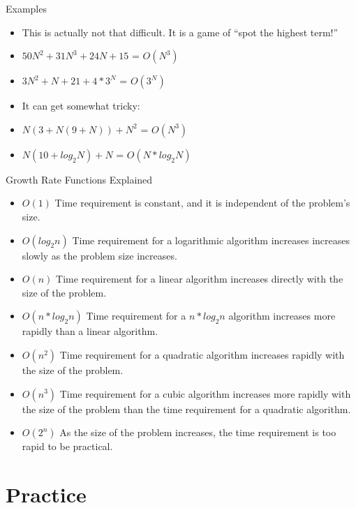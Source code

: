 \documentclass{beamer}
\begin{document}
\begin{frame}{Examples}
\begin{itemize}
\item This is actually not that difficult.  It is a game of ``spot the highest term!''
\item $50N^2 + 31N^3 + 24N + 15$ = $O(N^3)$ 
\item $3N^2 + N + 21 + 4*3^N$  = $O(3^N)$
\item It can get somewhat tricky:
\item $N(3 + N(9+N)) + N^2$ = $O(N^3)$
\item $N(10 + log_2N) + N$ = $O(N*log_2N)$
\end{itemize}
\end{frame}

\begin{frame}{Growth Rate Functions Explained}
\begin{itemize}
\item $O(1)$             Time requirement is constant, and it is independent of the problem's size.
\item $O(log_2n)$      Time requirement for a logarithmic algorithm increases increases slowly
                 as the problem size increases.
\item $O(n)$      Time requirement for a linear algorithm increases directly with the size
                 of the problem.
\item $O(n*log_2n)$ Time requirement for a $n*log_2n$ algorithm increases more rapidly than
                 a linear algorithm.
\item $O(n^2)$       Time requirement for a quadratic algorithm increases rapidly with the
                 size of the problem.
\item $O(n^3)$       Time requirement for a cubic algorithm increases more rapidly with the
                 size of the problem than the time requirement for a quadratic algorithm.
\item $O(2^n)$      As the size of the problem increases, the time requirement is too rapid to be practical.
\end{itemize}
\end{frame}

\section{Practice}
\end{document}

